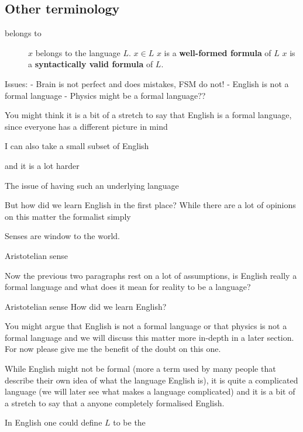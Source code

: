 \subsection{Other terminology}
\begin{description}
	\item[belongs to] $x$ belongs to the language $L$.
	$x \in L$
	$x$ is a \textbf{well-formed formula} of $L$
	$x$ is a \textbf{syntactically valid formula} of $L$.
\end{description}



Issues:
- Brain is not perfect and does mistakes, FSM do not!
- English is not a formal language
- Physics might be a formal language??

You might think it is a bit of a stretch to say that English is a formal language, since everyone has a different picture in mind 

 I can also take a small subset of English 



 and it is a lot harder 
 


The issue of having such an underlying language 



But how did we learn English in the first place? While there are a lot of opinions on this matter the formalist simply 



Senses are window to the world.

Aristotelian sense



Now the previous two paragraphs rest on a lot of assumptions, is English really a formal language and what does it mean for reality to be a language? 

Aristotelian sense
How did we learn English?

You might argue that English is not a formal language or that physics is not a formal language and we will discuss this matter more in-depth in a later section. For now please give me the benefit of the doubt on this one.


While English might not be formal (more a term used by many people that describe their own idea of what the language English is), it is quite a complicated language (we will later see what makes a language complicated) and it is a bit of a stretch to say that a anyone completely formalised English.

In English one could define $L$ to be the 


